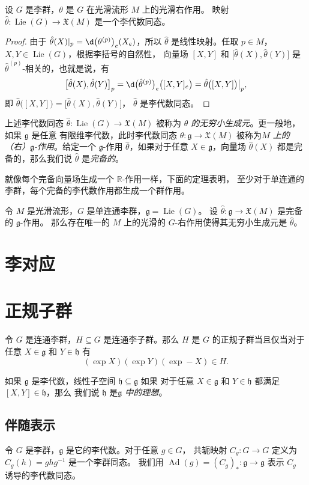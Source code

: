\documentclass[fontset=none]{Notes}
\DeclareMathOperator\Ad{Ad}
\DeclareMathOperator\Lie{Lie}
\newcommand{\lie}[1]{\mathfrak{#1}}
\begin{document}
\begin{theorem}
  设 $G$ 是李群，$\theta$ 是 $G$ 在光滑流形 $M$ 上的光滑右作用。
  映射 $\hat \theta:\Lie(G)\to \mathfrak{X}(M)$ 是一个李代数同态。
\end{theorem} 
\begin{proof}
  由于 $\hat\theta(X)|_p=\d\bigl(\theta^{(p)}\bigr)_e(X_e)$，所以
  $\hat\theta$ 是线性映射。任取 $p\in M$，
  $X,Y\in\Lie(G)$，根据李括号的自然性，
  向量场 $[X,Y]$ 和 $\bigl[\hat\theta(X),\hat\theta(Y)\bigr]$
  是 $\hat\theta^{(p)}$-相关的，也就是说，有
  \[
    \bigl[\hat\theta(X),\hat\theta(Y)\bigr]_{p}
    =\d\bigl(\hat\theta^{(p)}\bigr)_e\bigl([X,Y]_e\bigr)
    =\hat\theta\bigl([X,Y]\bigr)\big|_{p},
  \]
  即 $\hat\theta\bigl([X,Y]\bigr)=\bigl[\hat\theta(X),\hat\theta(Y)\bigr]$，
  $\hat\theta$ 是李代数同态。
\end{proof}

上述李代数同态 $\hat\theta:\Lie(G)\to \mathfrak{X}(M)$ 被称为
\emph{$\theta$ 的无穷小生成元}。更一般地，如果 $\lie g$ 是任意
有限维李代数，此时李代数同态 $\hat\theta:\lie g\to \mathfrak{X}(M)$
被称为\emph{$M$ 上的（右）$\lie g$-作用}。给定一个 $\lie g$-作用
$\hat\theta$，如果对于任意 $X\in \lie g$，向量场 $\hat\theta(X)$
都是完备的，那么我们说 $\hat\theta$ 是\emph{完备的}。

就像每个完备向量场生成一个 $\mathbb{R}$-作用一样，下面的定理表明，
至少对于单连通的李群，每个完备的李代数作用都生成一个群作用。

\begin{theorem}[李代数作用上的基本定理]
  令 $M$ 是光滑流形，$G$ 是单连通李群，$\lie g=\Lie(G)$。
  设 $\hat\theta:\lie g\to \mathfrak{X}(M)$ 是完备的 $\lie g$-作用。
  那么存在唯一的 $M$ 上的光滑的 $G$-右作用使得其无穷小生成元是
  $\hat\theta$。
\end{theorem}

\section{李对应}


\section{正规子群}

\begin{lemma}
  令 $G$ 是连通李群，$H\subseteq G$ 是连通李子群。那么 $H$
  是 $G$ 的正规子群当且仅当对于任意 $X\in\lie g$ 和 $Y\in\lie h$ 有
  \begin{equation}
    (\exp X)(\exp Y)(\exp -X)\in H.
  \end{equation}
\end{lemma}

如果 $\lie g$ 是李代数，线性子空间 $\lie h\subseteq \lie g$ 如果
对于任意 $X\in\lie g$ 和 $Y\in\lie h$ 都满足 $[X,Y]\in\lie h$，那么
我们说 $\lie h$ 是\emph{$\lie g$ 中的理想}。

\subsection{伴随表示}

令 $G$ 是李群，$\lie g$ 是它的李代数。对于任意 $g\in G$，
共轭映射 $C_g:G\to G$ 定义为 $C_g(h)=ghg^{-1}$ 是一个李群同态。
我们用 $\Ad(g)=(C_g)_*:\lie g\to \lie g$ 表示 $C_g$ 诱导的李代数同态。
\end{document}
